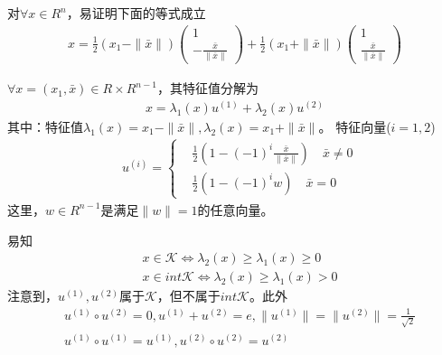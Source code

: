         \par
        对$\forall x \in R^n$，易证明下面的等式成立
        \begin{align*}
          x=\frac 12 (x_1-\|\bar{x}\|)\begin{pmatrix} 1 \\-\frac{\bar{x}}{\|\bar{x}\|}\end{pmatrix}+\frac 12 (x_1+\|\bar{x}\|)\begin{pmatrix} 1 \\\frac{\bar{x}}{\|\bar{x}\|}\end{pmatrix}
        \end{align*}
        \begin{definition}[特征值分解]$\forall x = (x_1,\bar{x})\in R\times R^{n-1}$，其特征值分解为
        \begin{align*}
          x={\lambda}_1(x)u^{(1)}+{\lambda}_2(x)u^{(2)}
        \end{align*}
        其中：特征值${\lambda}_1(x)=x_1-\|\bar{x}\|,{\lambda}_2(x)=x_1+\|\bar{x}\|$。
        特征向量($i =1,2$)
        \begin{align*}
          & u^{(i)}=\left\{
            \begin{aligned}
          &\frac 12 \left( 1-(-1)^i \frac{\bar{x}}{\|\bar{x}\|} \right) \quad \bar{x}\neq 0\\
          &\frac 12 \left( 1-(-1)^i w \right) \quad \bar{x} = 0
            \end{aligned}
             \right.
        \end{align*}
        这里，$w \in R^{n-1}$是满足$\|w\|=1$的任意向量。
        \end{definition}
        \par
        易知
        \begin{align*}
          & x \in \mathcal{K}\Leftrightarrow {\lambda}_2(x) \geqslant {\lambda}_1(x) \geqslant 0\\
          & x \in int{}\mathcal{K}\Leftrightarrow {\lambda}_2(x) \geqslant {\lambda}_1(x) > 0
        \end{align*}
        注意到，$u^{(1)},u^{(2)}$属于$\mathcal{K}$，但不属于$int \mathcal{K}$。此外
        \begin{align*}
          & u^{(1)}\circ u^{(2)}=0,u^{(1)}+u^{(2)}=e,\|u^{(1)}\|=\|u^{(2)}\|=\frac {1}{\sqrt{2}}\\
          & u^{(1)}\circ u^{(1)}=u^{(1)},u^{(2)}\circ u^{(2)}=u^{(2)}
        \end{align*}
        \par
